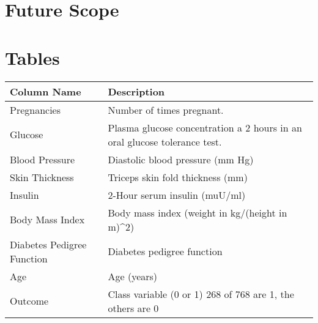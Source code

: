 \documentclass[12pt]{article}
\begin{document}
\newpage
\section{Future Scope}

\newpage
\section{Tables}
{
\clearpage
\thispagestyle{empty}
\begin{landscape}
\centering
\begin{table}[]
\centering
\begin{tabular}{|l|l|}
\hline
Column Name                & Description                                                               \\ \hline
Pregnancies                & Number of times pregnant.                                                 \\ \hline
Glucose                    & Plasma glucose concentration a 2 hours in an oral glucose tolerance test. \\ \hline
Blood Pressure             & Diastolic blood pressure (mm Hg)                                          \\ \hline
Skin Thickness             & Triceps skin fold thickness (mm)                                          \\ \hline
Insulin                    & 2-Hour serum insulin (muU/ml)                                            \\ \hline
Body Mass Index            & Body mass index (weight in kg/(height in m)\textasciicircum{}2)           \\ \hline
Diabetes Pedigree Function & Diabetes pedigree function                                                \\ \hline
Age                        & Age (years)                                                               \\ \hline
Outcome                    & Class variable (0 or 1) 268 of 768 are 1, the others are 0                \\ \hline
\end{tabular}
\end{table}
\label{table:1}
\end{landscape}
\clearpage
}
\end{document}
